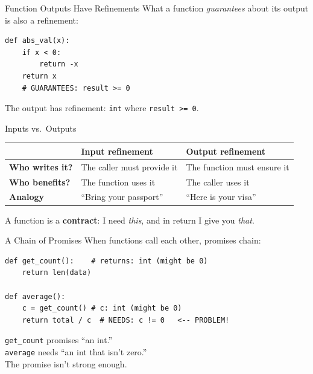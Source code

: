 \documentclass[aspectratio=169,10pt]{beamer}
\begin{document}
\begin{frame}[fragile]{Function Outputs Have Refinements}
What a function \emph{guarantees} about its output is also a refinement:
\begin{lstlisting}
def abs_val(x):
    if x < 0:
        return -x
    return x
    # GUARANTEES: result >= 0
\end{lstlisting}
\vspace{0.3em}
The output has refinement: \texttt{int} where \texttt{result >= 0}.
\end{frame}

\begin{frame}{Inputs vs.\ Outputs}
\begin{center}
\begin{tabular}{@{}lll@{}}
            & \textbf{Input refinement} & \textbf{Output refinement} \\
\hline
\textbf{Who writes it?} & The caller must provide it & The function must ensure it \\
\textbf{Who benefits?}  & The function uses it & The caller uses it \\
\textbf{Analogy}        & ``Bring your passport'' & ``Here is your visa'' \\
\end{tabular}
\end{center}
\vspace{0.3em}
A function is a \textbf{contract}: I need \emph{this}, and in return I give you \emph{that}.
\end{frame}

\begin{frame}[fragile]{A Chain of Promises}
When functions call each other, promises chain:
\begin{lstlisting}
def get_count():    # returns: int (might be 0)
    return len(data)

def average():
    c = get_count() # c: int (might be 0)
    return total / c  # NEEDS: c != 0   <-- PROBLEM!
\end{lstlisting}
\vspace{0.3em}
\texttt{get\_count} promises ``an int.''\\
\texttt{average} needs ``an int that isn't zero.''\\
The promise isn't strong enough.
\end{frame}
\end{document}
